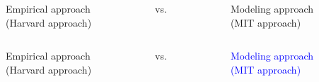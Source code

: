 \documentclass[aspectratio=169]{beamer}
\begin{document}
\begin{frame}

\begin{center}
\begin{columns}
\begin{column}{0.4\textwidth}
Empirical approach\\(Harvard approach)
\end{column}
\begin{column}{0.2\textwidth}
vs.
\end{column}
\begin{column}{0.4\textwidth}
Modeling approach\\(MIT approach)
\end{column}
\end{columns}
\end{center}

\end{frame}
\begin{frame}

\begin{center}
\begin{columns}
\begin{column}{0.4\textwidth}
Empirical approach\\(Harvard approach)
\end{column}
\begin{column}{0.2\textwidth}
vs.
\end{column}
\begin{column}{0.4\textwidth}
\textcolor{blue}{Modeling approach\\(MIT approach)}
\end{column}
\end{columns}
\end{center}

\end{frame}
\end{document}
